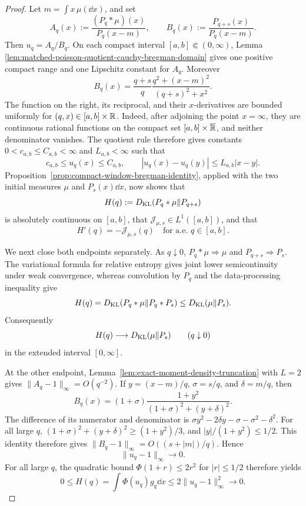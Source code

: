\begin{proof}
Let \(m=\int x\,\mu(\dd x)\), and set
\[
A_q(x):=\frac{(P_q*\mu)(x)}{P_q(x-m)},\qquad
B_q(x):=\frac{P_{q+s}(x)}{P_q(x-m)}.
\]
Then \(u_q=A_q/B_q\).  On each compact interval
\([a,b]\Subset(0,\infty)\), Lemma
\ref{lem:matched-poisson-quotient-cauchy-bregman-domain} gives one positive
compact range and one Lipschitz constant for \(A_q\).  Moreover
\[
B_q(x)=\frac{q+s}{q}
\frac{q^2+(x-m)^2}{(q+s)^2+x^2}.
\]
The function on the right, its reciprocal, and their \(x\)-derivatives are
bounded uniformly for \((q,x)\in[a,b]\times\mathbb{R}\).  Indeed, after adjoining
the point \(x=\infty\), they are continuous rational functions on the
compact set \([a,b]\times\overline{\mathbb{R}}\), and neither denominator vanishes.
The quotient rule therefore gives constants
\(0<c_{a,b}\le C_{a,b}<\infty\) and \(L_{a,b}<\infty\) such that
\[
c_{a,b}\le u_q(x)\le C_{a,b},\qquad
|u_q(x)-u_q(y)|\le L_{a,b}|x-y|.
\]
Proposition~\ref{prop:compact-window-bregman-identity}, applied with the two
initial measures \(\mu\) and \(P_s(x)\dd x\), now shows that
\[
H(q):=D_{\rm KL}(P_q*\mu\|P_{q+s})
\]
is absolutely continuous on \([a,b]\), that
\(\mathcal J_{\mu,s}\in L^1([a,b])\), and that
\begin{equation}\label{eq:johnson-cauchy-q-derivative}
H'(q)=-\mathcal J_{\mu,s}(q)
\quad\text{for a.e. }q\in[a,b].
\end{equation}

We next close both endpoints separately.  As \(q\downarrow0\),
\(P_q*\mu\Rightarrow\mu\) and \(P_{q+s}\Rightarrow P_s\).  The variational
formula for relative entropy gives joint lower semicontinuity under weak
convergence, whereas convolution by \(P_q\) and the data-processing inequality
give
\[
H(q)=D_{\rm KL}(P_q*\mu\|P_q*P_s)
\le D_{\rm KL}(\mu\|P_s).
\]
Consequently
\begin{equation}\label{eq:johnson-cauchy-zero-endpoint}
H(q)\longrightarrow D_{\rm KL}(\mu\|P_s)
\qquad(q\downarrow0)
\end{equation}
in the extended interval \([0,\infty]\).

At the other endpoint, Lemma~\ref{lem:exact-moment-density-truncation} with
\(L=2\) gives \(\|A_q-1\|_\infty=O(q^{-2})\).  If
\(y=(x-m)/q\), \(\sigma=s/q\), and \(\delta=m/q\), then
\[
B_q(x)=(1+\sigma)
\frac{1+y^2}{(1+\sigma)^2+(y+\delta)^2}.
\]
The difference of its numerator and denominator is
\(\sigma y^2-2\delta y-\sigma-\sigma^2-\delta^2\).  For all large \(q\),
\((1+\sigma)^2+(y+\delta)^2\ge(1+y^2)/3\), and
\(|y|/(1+y^2)\le1/2\).  This identity therefore gives
\(\|B_q-1\|_\infty=O((s+|m|)/q)\).  Hence
\begin{equation}\label{eq:johnson-cauchy-infinity-quotient}
\|u_q-1\|_\infty\longrightarrow0.
\end{equation}
For all large \(q\), the quadratic bound
\(\Phi(1+r)\le2r^2\) for \(|r|\le1/2\) therefore yields
\[
0\le H(q)=\int \Phi(u_q)g_q\dd x
\le2\|u_q-1\|_\infty^2\longrightarrow0.
\]


\end{proof}

